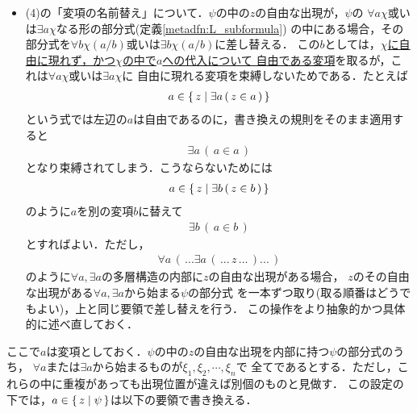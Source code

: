 \begin{itemize}
		\item (4)の「変項の名前替え」について．$\psi$の中の$z$の自由な出現が，$\psi$の
			$\forall a \chi$或いは$\exists a \chi$なる形の部分式(定義\ref{metadfn:L_subformula})
			の中にある場合，その部分式を$\forall b \chi(a/b)$或いは$\exists b \chi(a/b)$に差し替える．
			この$b$としては，\underline{$\chi$に自由に現れず，かつ$\chi$の中で$a$への代入について
			自由である変項}を取るが，これは$\forall a \chi$或いは$\exists a \chi$に
			自由に現れる変項を束縛しないためである．たとえば
			\begin{align}
				a \in \{\, z \mid \exists a\, (\, z \in a\, )\, \}
			\end{align}
			という式では左辺の$a$は自由であるのに，書き換えの規則をそのまま適用すると
			\begin{align}
				\exists a\, (\, a \in a\, )
			\end{align}
			となり束縛されてしまう．こうならないためには
			\begin{align}
				a \in \{\, z \mid \exists b\, (\, z \in b\, )\, \}
			\end{align}
			のように$a$を別の変項$b$に替えて
			\begin{align}
				\exists b\, (\, a \in b\, )
			\end{align}
			とすればよい．ただし，
			\begin{align}
				\forall a\, (\, ...\exists a\, (\, ...\, z\, ...\, )...\, )
			\end{align}
			のように$\forall a,\exists a$の多層構造の内部に$z$の自由な出現がある場合，
			$z$のその自由な出現がある$\forall a,\exists a$から始まる$\psi$の部分式
			を一本ずつ取り(取る順番はどうでもよい)，上と同じ要領で差し替えを行う．
			この操作をより抽象的かつ具体的に述べ直しておく．
	\end{itemize}
		
	\begin{screen}
		\begin{rem}
		\label{rem:rewriting_of_the_4th_kind}
			ここで$a$は変項としておく．$\psi$の中の$z$の自由な出現を内部に持つ$\psi$の部分式のうち，
			$\forall a$または$\exists a$から始まるものが$\xi_{1},\xi_{2},\cdots,\xi_{n}$で
			全てであるとする．ただし，これらの中に重複があっても出現位置が違えば別個のものと見做す．
			この設定の下では，$a \in \{\, z \mid \psi\, \}$は以下の要領で書き換える．
		\end{rem}
	\end{screen}
	
